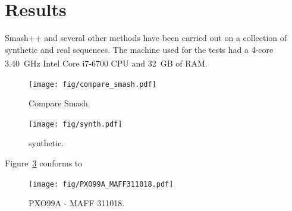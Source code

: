 \documentclass[a4paper,num-refs]{oup-contemporary}
\begin{document}
\section{Results} \label{sec.results}
Smash++ and several other methods have been carried out on a collection of synthetic and real sequences. The machine used for the tests had a 4-core 3.40~GHz Intel\textsuperscript{\textregistered} Core{\texttrademark} i7-6700 CPU and 32~GB of RAM.


\begin{figure}[!h]
  \centering
  \texttt{[image: fig/compare\_smash.pdf]}
  \caption{Compare Smash.}
  \label{fig.compare.smash}
\end{figure}

\begin{figure}[!h]
  \centering
  \texttt{[image: fig/synth.pdf]}
  \caption{synthetic.}
  \label{fig.synth}
\end{figure}

Figure~\ref{fig.PXO99A.MAFF311018} conforms to \cite{salzberg2008genome}
\begin{figure}[!h]
  \centering
  \texttt{[image: fig/PXO99A\_MAFF311018.pdf]}
  \caption{PXO99A - MAFF 311018.}
  \label{fig.PXO99A.MAFF311018}
\end{figure}



\end{document}
